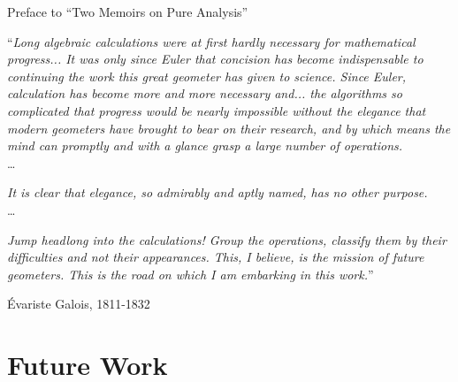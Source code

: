 \documentclass{beamer}
\begin{document}
    \begin{frame}{Preface to “Two Memoirs on Pure Analysis”}
        \setlength{\epigraphwidth}{0.97\textwidth}
        \epigraph{``\textit{Long algebraic calculations were at first hardly necessary for mathematical progress... It was only since Euler that concision has become indispensable to continuing the work this great geometer has given to science. Since Euler, calculation has become more and more necessary and... the algorithms so complicated that progress would be nearly impossible without the elegance that modern geometers have brought to bear on their research, and by which means the mind can promptly and with a glance grasp a large number of operations.}\\

        \vspace{5pt}
        \ldots\\
        \vspace{5pt}

        \textit{It is clear that elegance, so admirably and aptly named, has no other purpose.}\\

        \vspace{5pt}
        \ldots\\
        \vspace{5pt}

        \textit{Jump headlong into the calculations! Group the operations, classify them by their difficulties and not their appearances. This, I believe, is the mission of future geometers. This is the road on which I am embarking in this work.}''}{\'Evariste Galois, 1811-1832}
    \end{frame}

    \section{Future Work}
\end{document}
